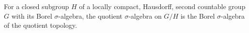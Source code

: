 For a closed subgroup $H$ of a locally compact, Hausdorff, second countable group $G$ with its Borel $\sigma$-algebra, the quotient $\sigma$-algebra on $G/H$ is the Borel $\sigma$-algebra of the quotient topology.

